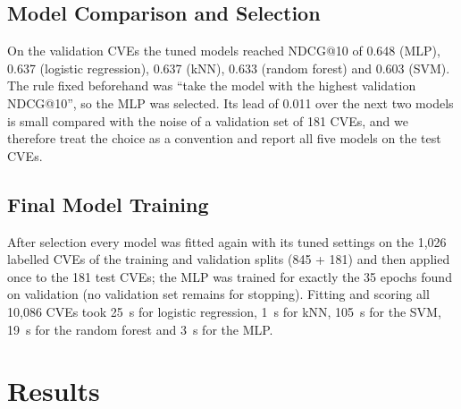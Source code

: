 \documentclass[12pt, a4paper]{article}
\begin{document}
\subsection{Model Comparison and Selection}
On the validation CVEs the tuned models reached NDCG@10 of 0.648 (MLP), 0.637 (logistic regression), 0.637 (kNN), 0.633 (random forest) and 0.603 (SVM). The rule fixed beforehand was ``take the model with the highest validation NDCG@10'', so the MLP was selected. Its lead of 0.011 over the next two models is small compared with the noise of a validation set of 181 CVEs, and we therefore treat the choice as a convention and report all five models on the test CVEs.
\subsection{Final Model Training}
After selection every model was fitted again with its tuned settings on the 1,026 labelled CVEs of the training and validation splits (845 + 181) and then applied once to the 181 test CVEs; the MLP was trained for exactly the 35 epochs found on validation (no validation set remains for stopping). Fitting and scoring all 10,086 CVEs took 25~s for logistic regression, 1~s for kNN, 105~s for the SVM, 19~s for the random forest and 3~s for the MLP.

\section{Results}
\end{document}
